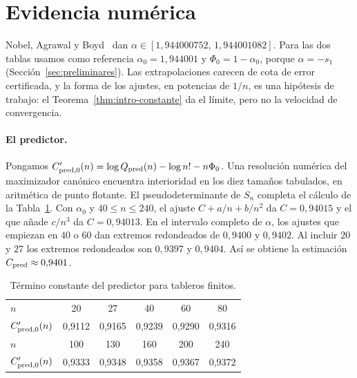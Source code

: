 \section{Evidencia numérica}\label{sec:numerico}

Nobel, Agrawal y Boyd~\cite{NAB} dan $\alpha\in[1{,}944000752,\,1{,}944001082]$.
Para las dos tablas usamos como referencia $\alpha_0=1{,}944001$ y $\Phi_0=1-\alpha_0$,
porque $\alpha=-s_1$ (Sección~\ref{sec:preliminares}). Las extrapolaciones carecen de cota de error
certificada, y la forma de los ajustes, en potencias de $1/n$, es una hipótesis de trabajo: el
Teorema~\ref{thm:intro-constante} da el límite, pero no la velocidad de convergencia.

\paragraph{El predictor.}
Pongamos $C'_{{\rm pred},0}(n)=\log Q_{\rm pred}(n)-\log n!-n\Phi_0$. Una resolución numérica del
maximizador
canónico encuentra interioridad en los diez tamaños tabulados, en aritmética de punto flotante.
El pseudodeterminante de $S_n$ completa el cálculo de la Tabla~\ref{tab:predictor}.
Con $\alpha_0$ y $40\le n\le240$, el ajuste $C+a/n+b/n^2$ da $C=0{,}94015$ y el que añade $c/n^3$ da
$C=0{,}94013$.
En el intervalo completo de $\alpha$, los ajustes que empiezan en $40$ o $60$ dan extremos redondeados de
$0{,}9400$ y $0{,}9402$.
Al incluir $20$ y $27$ los extremos redondeados son $0{,}9397$ y $0{,}9404$. Así se obtiene la estimación
$C_{\rm pred}\approx0{,}9401$.

\begin{table}[ht]
\centering
\begin{tabular}{lccccc}
\toprule
$n$ & 20 & 27 & 40 & 60 & 80\\
$C'_{{\rm pred},0}(n)$ & 0,9112 & 0,9165 & 0,9239 & 0,9290 & 0,9316\\
\midrule
$n$ & 100 & 130 & 160 & 200 & 240\\
$C'_{{\rm pred},0}(n)$ & 0,9333 & 0,9348 & 0,9358 & 0,9367 & 0,9372\\
\bottomrule
\end{tabular}
\caption{Término constante del predictor para tableros finitos.}\label{tab:predictor}
\end{table}

